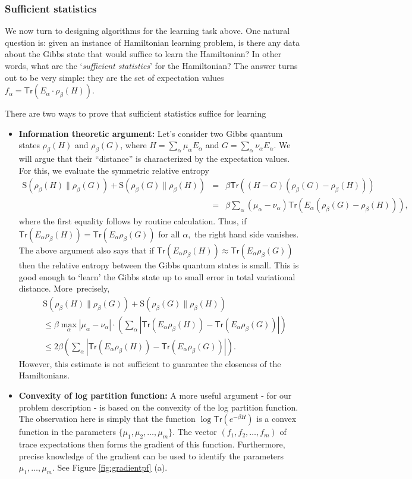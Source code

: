 \documentclass[11pt]{article}
\newcommand{\Tr}{\textsf{Tr}}
\newcommand{\relent}[2]{\mathrm{S}\left(#1\|#2\right)}
\begin{document}
\subsubsection{Sufficient statistics}
We now turn to designing algorithms for the learning task above. One natural question is: given an instance of Hamiltonian learning problem, is there any data about the Gibbs state that would suffice to learn the Hamiltonian? In other words, what are the `\emph{sufficient statistics}' for the Hamiltonian? The answer turns out to be very simple: they are the set of expectation values $f_\alpha= \Tr(E_\alpha \cdot \rho_\beta(H))$. 

There are two ways to prove that sufficient statistics suffice for learning
\begin{itemize}
    \item \textbf{Information theoretic argument:} Let's consider two Gibbs quantum states $\rho_\beta(H)$ and $\rho_\beta(G)$, where $H=\sum_\alpha \mu_\alpha E_\alpha$ and $G=\sum_\alpha \nu_\alpha E_\alpha$. We will argue that their ``distance'' is characterized by the expectation values. For this, we evaluate the symmetric relative entropy
\begin{eqnarray*}
\relent{\rho_\beta(H)}{\rho_\beta(G)}+\relent{\rho_\beta(G)}{\rho_\beta(H)}&=&\beta\Tr((H-G)(\rho_\beta(G)-\rho_\beta(H)))\\
&=& \beta\sum_\alpha(\mu_\alpha-\nu_\alpha)\Tr(E_\alpha(\rho_\beta(G)-\rho_\beta(H))),
\end{eqnarray*}
where the first equality follows by routine calculation. Thus, if $\Tr(E_\alpha \rho_\beta(H))=\Tr(E_\alpha \rho_\beta(G))$ for all $\alpha,$ the right hand side vanishes. The above argument also says that if $\Tr(E_\alpha \rho_\beta(H))\approx\Tr(E_\alpha \rho_\beta(G))$ then the relative entropy between the Gibbs quantum states is small. This is good enough to `learn' the Gibbs state up to small error in total variational distance. More~precisely, 
\begin{align*}
&\relent{\rho_\beta(H)}{\rho_\beta(G)}+\relent{\rho_\beta(G)}{\rho_\beta(H)} \\
&\leq \beta \max_\alpha|\mu_\alpha-\nu_\alpha|\cdot\left(\sum_\alpha|\Tr(E_\alpha \rho_\beta(H))-\Tr(E_\alpha \rho_\beta(G))|\right)\\
&\leq  2\beta \left(\sum_\alpha|\Tr(E_\alpha \rho_\beta(H))-\Tr(E_\alpha \rho_\beta(G))|\right).
\end{align*}
However, this estimate is not sufficient to guarantee the closeness of the Hamiltonians.
\item \textbf{Convexity of log partition function:} A more useful argument - for our problem description - is based on the convexity of the log partition function. The observation here is simply that the function $\log \Tr(e^{-\beta H})$ is a convex function in the parameters $\{\mu_1,\mu_2,\ldots, \mu_m\}$. The vector $(f_1,f_2,\ldots, f_m)$ of trace expectations then forms the gradient of this function. Furthermore, precise knowledge of the gradient can be used to identify the parameters $\mu_1,\ldots,\mu_m$. See Figure \ref{fig:gradientpf} (a).
\end{itemize}
\end{document}
